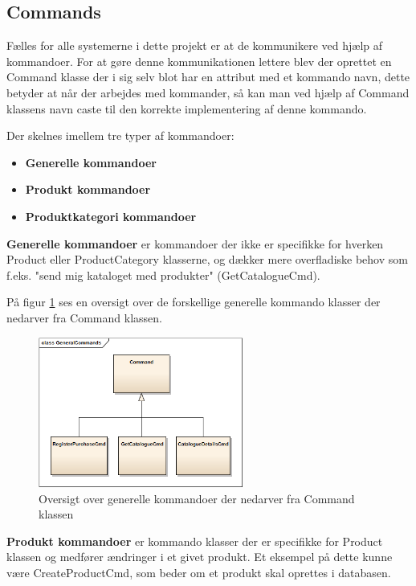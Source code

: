 \subsection{Commands}\label{COMMAND}
Fælles for alle systemerne i dette projekt er at de kommunikere ved hjælp af kommandoer. For at gøre denne kommunikationen lettere blev der oprettet en Command klasse der i sig selv blot har en attribut med et kommando navn, dette betyder at når der arbejdes med kommander, så kan man ved hjælp af Command klassens navn caste til den korrekte implementering af denne kommando.

Der skelnes imellem tre typer af kommandoer:

\begin{itemize}
\item \textbf{Generelle kommandoer} 
\item \textbf{Produkt kommandoer} 
\item \textbf{Produktkategori kommandoer}
\end{itemize}

\textbf{Generelle kommandoer} er kommandoer der ikke er specifikke for hverken Product eller ProductCategory klasserne, og dækker mere overfladiske behov som f.eks. "send mig kataloget med produkter" (GetCatalogueCmd).

På figur \ref{fig:overklasseGen} ses en oversigt over de forskellige generelle kommando klasser der nedarver fra Command klassen.

\begin{figure}[H]
    \centering
    \includegraphics[width=0.6\textwidth]{Systemdesign/SharedLib/Images/Commands/GeneralCommands.png}
    \caption{Oversigt over generelle kommandoer der nedarver fra Command klassen}
    \label{fig:overklasseGen}
\end{figure}

\textbf{Produkt kommandoer} er kommando klasser der er specifikke for Product klassen og medfører ændringer i et givet produkt. Et eksempel på dette kunne være CreateProductCmd, som beder om et produkt skal oprettes i databasen.

